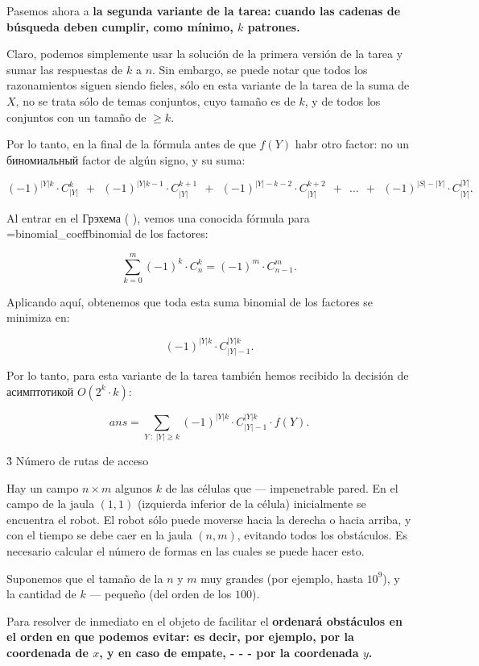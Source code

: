 Pasemos ahora a \bf{la segunda variante de la tarea}: cuando las cadenas de búsqueda deben cumplir, como mínimo, $k$ patrones.

Claro, podemos simplemente usar la solución de la primera versión de la tarea y sumar las respuestas de $k$ a $n$. Sin embargo, se puede notar que todos los razonamientos siguen siendo fieles, sólo en esta variante de la tarea de la suma de $X$, no se trata sólo de temas conjuntos, cuyo tamaño es de $k$, y de todos los conjuntos con un tamaño de $\ge k$.

Por lo tanto, en la final de la fórmula antes de que $f(Y)$ habr otro factor: no un биномиальный factor de algún signo, y su suma:

$$ (-1)^{|Y|k} \cdot C_{|Y|}^k ~~ + ~~ (-1)^{|Y|k-1} \cdot C_{|Y|}^{k+1} ~~ + ~~ (-1)^{|Y|-k-2} \cdot C_{|Y|}^{k+2} ~~ + ~~ \ldots ~~ + ~~ (-1)^{|S|-|Y|} \cdot C_{|Y|}^{|Y|}. $$

Al entrar en el Грэхема ( ), vemos una conocida fórmula para \algohref=binomial_coeff{binomial de los factores}:

$$ \sum_{k=0}^m (-1)^k \cdot C_n^k = (-1)^m \cdot C_{n-1}^m. $$

Aplicando aquí, obtenemos que toda esta suma binomial de los factores se minimiza en:

$$ (-1)^{|Y|k} \cdot C_{|Y|-1}^{|Y|k}. $$

Por lo tanto, para esta variante de la tarea también hemos recibido la decisión de асимптотикой $O(2^k \cdot k)$:

$$ ans = \sum_{Y ~ : ~ |Y| \ge k} (-1)^{|Y|k} \cdot C_{|Y|-1}^{|Y|k} \cdot f(Y). $$


\h3{ Número de rutas de acceso }

Hay un campo $n \times m$ algunos $k$ de las células que --- impenetrable pared. En el campo de la jaula $(1,1)$ (izquierda inferior de la célula) inicialmente se encuentra el robot. El robot sólo puede moverse hacia la derecha o hacia arriba, y con el tiempo se debe caer en la jaula $(n,m)$, evitando todos los obstáculos. Es necesario calcular el número de formas en las cuales se puede hacer esto.

Suponemos que el tamaño de la $n$ y $m$ muy grandes (por ejemplo, hasta $10^9$), y la cantidad de $k$ --- pequeño (del orden de los $100$).

Para resolver de inmediato en el objeto de facilitar el \bf{ordenará} obstáculos en el orden en que podemos evitar: es decir, por ejemplo, por la coordenada de $x$, y en caso de empate, - - - por la coordenada $y$.

